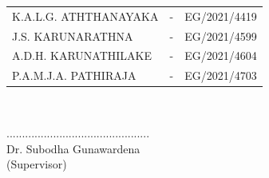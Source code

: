 \begin{center}
  \begin{tabular}[h]{lll}
      K.A.L.G. ATHTHANAYAKA 	& - & 	EG/2021/4419\\
       J.S. KARUNARATHNA	& - & 	EG/2021/4599\\
        A.D.H. KARUNATHILAKE	& - & 	EG/2021/4604\\
         P.A.M.J.A. PATHIRAJA  	& - &	EG/2021/4703
          \end{tabular}\\
          \vspace{0.8cm}

          \vspace{0.8cm}

           .............................................. \\
           Dr. Subodha Gunawardena\\
           (Supervisor)






           \end{center}

           